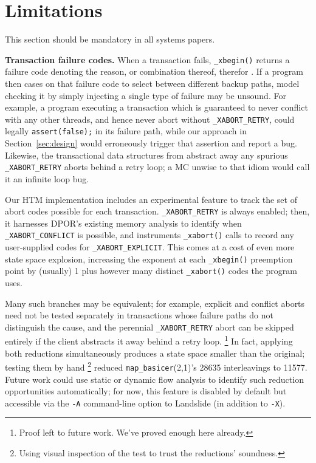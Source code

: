 \documentclass[10pt]{sigplanconf}
\begin{document}
\section{Limitations}
\label{sec:warpzone}

This section should be mandatory in all systems papers.

{\bf Transaction failure codes.}
When a transaction fails, {\tt \_xbegin()} returns a failure code
denoting the reason, or combination thereof, therefor \cite{htm-gcc}.
If a program then cases on that failure code to select between different backup paths,
model checking it by simply injecting a single type of failure may be unsound.
For example, a program executing a transaction which is guaranteed to never conflict with any other threads,
and hence never abort without {\tt \_XABORT\_RETRY},
could legally {\tt assert(false);} in its failure path,
while our approach in Section~\ref{sec:design} would erroneously trigger that assertion and report a bug.
Likewise, the transactional data structures from \cite{htm-mario}
abstract away any spurious {\tt \_XABORT\_RETRY} aborts behind a retry loop;
a MC unwise to that idiom would call it an infinite loop bug.

Our HTM implementation includes an experimental feature
to track the set of abort codes possible for each transaction.
{\tt \_XABORT\_RETRY} is always enabled;
then,
it harnesses DPOR's existing memory analysis to identify when {\tt \_XABORT\_CONFLICT} is possible,
and instruments {\tt \_xabort()} calls to record any user-supplied codes for {\tt \_XABORT\_EXPLICIT}.
This comes at a cost of even more state space explosion,
increasing the exponent at each {\tt \_xbegin()} preemption point
by (usually) 1 plus however many distinct {\tt \_xabort()} codes the program uses.

Many such branches may be equivalent;
for example,
explicit and conflict aborts need not be tested separately in transactions
whose failure paths do not distinguish the cause,
and the perennial {\tt \_XABORT\_RETRY} abort can be skipped entirely
if the client abstracts it away behind a retry loop.%
\footnote{Proof left to future work. We've proved enough here already.}
In fact, applying both reductions simultaneously
produces a state space smaller than the original;
testing them by hand
\footnote{Using visual inspection of the test to trust the reductions' soundness.}
reduced {\tt map\_basicer}(2,1)'s 28635 interleavings to 11577.
%
%
Future work could use static or dynamic flow analysis to
identify such reduction opportunities automatically;
for now, this feature is disabled by default but accessible via the {\tt -A} command-line option
to Landslide (in addition to {\tt -X}).
\end{document}
